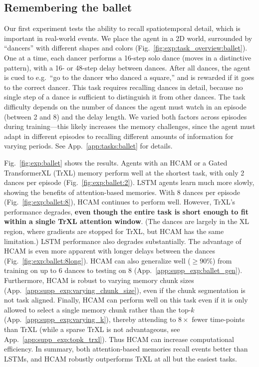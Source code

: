 \documentclass{article}
\begin{document}
\subsection{Remembering the ballet} \label{sec:exp:ballet}
Our first experiment tests the ability to recall spatiotemporal detail, which is important in real-world events. We place the agent in a 2D world, surrounded by ``dancers'' with different shapes and colors (Fig.\ \ref{fig:exp:task_overview:ballet}). One at a time, each dancer performs a 16-step solo dance (moves in a distinctive pattern), with a 16- or 48-step delay between dances. After all dances, the agent is cued to e.g.\ ``go to the dancer who danced a square,'' and is rewarded if it goes to the correct dancer. This task requires recalling dances in detail, because no single step of a dance is sufficient to distinguish it from other dances. The task difficulty depends on the number of dances the agent must watch in an episode (between 2 and 8) and the delay length. We varied both factors across episodes during training---this likely increases the memory challenges, since the agent must adapt in different episodes to recalling different amounts of information for varying periods. See App.\ \ref{app:tasks:ballet} for details.

Fig.\ \ref{fig:exp:ballet} shows the results. Agents with an HCAM or a Gated TransformerXL (TrXL) memory perform well at the shortest task, with only 2 dances per episode (Fig.\ \ref{fig:exp:ballet:2}). LSTM agents learn much more slowly, showing the benefits of attention-based memories. With 8 dances per episode (Fig.\ \ref{fig:exp:ballet:8}), HCAM continues to perform well. However, TrXL's performance degrades, \textbf{even though the entire task is short enough to fit within a single TrXL attention window}. (The dances are largely in the XL region, where gradients are stopped for TrXL, but HCAM has the same limitation.) LSTM performance also degrades substantially. The advantage of HCAM is even more apparent with longer delays between the dances (Fig.\ \ref{fig:exp:ballet:8long}). HCAM can also generalize well (\(\geq 90\)\%) from training on up to 6 dances to testing on 8 (App.\ \ref{app:supp_exp:ballet_gen}). Furthermore, HCAM is robust to varying memory chunk sizes (App.\ \ref{app:supp_exp:varying_chunk_size}), even if the chunk segmentation is not task aligned. Finally, HCAM can perform well on this task even if it is only allowed to select a single memory chunk rather than the top-\(k\) (App.\ \ref{app:supp_exp:varying_k}), thereby attending to \(8\times\) fewer time-points than TrXL (while a sparse TrXL is not advantageous, see App.\ \ref{app:supp_exp:topk_trxl}). Thus HCAM can increase computational efficiency. In summary, both attention-based memories recall events better than LSTMs, and HCAM robustly outperforms TrXL at all but the easiest tasks.
\end{document}
